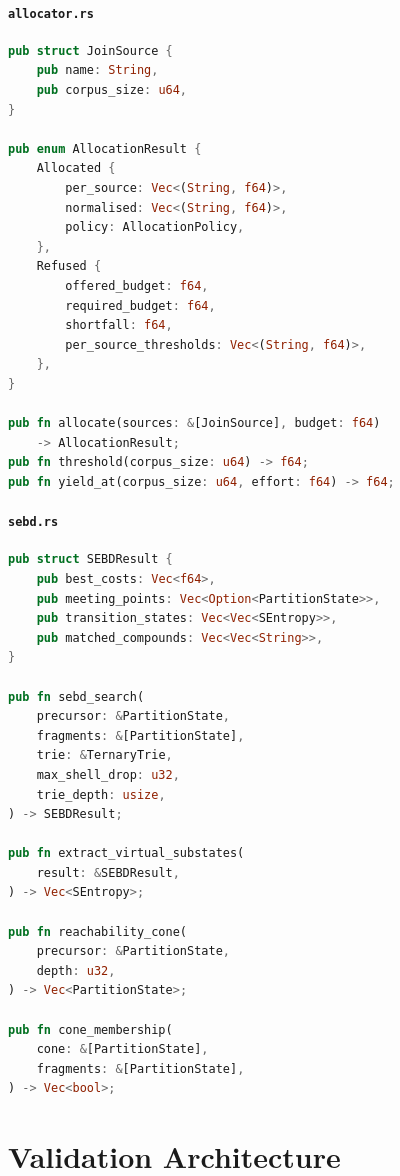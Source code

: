 \documentclass[11pt,a4paper]{article}
\theoremstyle{planstyle}
\theoremstyle{definition}
\theoremstyle{remark}
\begin{document}
\subsection{\texttt{allocator.rs}}

\begin{lstlisting}[language=rust]
pub struct JoinSource {
    pub name: String,
    pub corpus_size: u64,
}

pub enum AllocationResult {
    Allocated {
        per_source: Vec<(String, f64)>,
        normalised: Vec<(String, f64)>,
        policy: AllocationPolicy,
    },
    Refused {
        offered_budget: f64,
        required_budget: f64,
        shortfall: f64,
        per_source_thresholds: Vec<(String, f64)>,
    },
}

pub fn allocate(sources: &[JoinSource], budget: f64)
    -> AllocationResult;
pub fn threshold(corpus_size: u64) -> f64;
pub fn yield_at(corpus_size: u64, effort: f64) -> f64;
\end{lstlisting}

\subsection{\texttt{sebd.rs}}

\begin{lstlisting}[language=rust]
pub struct SEBDResult {
    pub best_costs: Vec<f64>,
    pub meeting_points: Vec<Option<PartitionState>>,
    pub transition_states: Vec<Vec<SEntropy>>,
    pub matched_compounds: Vec<Vec<String>>,
}

pub fn sebd_search(
    precursor: &PartitionState,
    fragments: &[PartitionState],
    trie: &TernaryTrie,
    max_shell_drop: u32,
    trie_depth: usize,
) -> SEBDResult;

pub fn extract_virtual_substates(
    result: &SEBDResult,
) -> Vec<SEntropy>;

pub fn reachability_cone(
    precursor: &PartitionState,
    depth: u32,
) -> Vec<PartitionState>;

pub fn cone_membership(
    cone: &[PartitionState],
    fragments: &[PartitionState],
) -> Vec<bool>;
\end{lstlisting}

\part{Validation Architecture}
\end{document}
